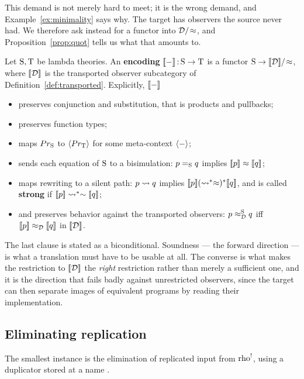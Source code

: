 \documentclass{article}
\begin{document}
This demand is not merely hard to meet; it is the wrong demand, and Example~\ref{ex:minimality} says why. The target has observers the source never had. We therefore ask instead for a functor into $\mathcal{D}/\!\approx$, and Proposition~\ref{prop:quot} tells us what that amounts to.

\begin{definition}
\label{def:encoding}
    Let $\mathrm{S},\mathrm{T}$ be lambda theories. An \textbf{encoding} $[\![-]\!]\,{:}\, \mathrm{S}\to \mathrm{T}$ is a functor $\mathrm{S}\to [\![\mathcal{D}]\!]/\!\approx$, where $[\![\mathcal{D}]\!]$ is the transported observer subcategory of Definition~\ref{def:transported}. Explicitly, $[\![-]\!]$
    \begin{itemize}
        \item preserves conjunction and substitution, that is products and pullbacks;
        \item preserves function types;
        \item maps $Pr_{\mathrm{S}}$ to $\langle Pr_{\mathrm{T}}\rangle$ for some meta-context $\langle -\rangle$;
        \item sends each equation of $\mathrm{S}$ to a bisimulation: $p=_{\mathrm{S}}q$ implies $[\![p]\!]\approx[\![q]\!]$;
        \item maps rewriting to a silent path: $p\rightsquigarrow q$ implies $[\![p]\!](\rightsquigarrow^\ast\approx)^\ast[\![q]\!]$, and is called \textbf{strong} if $[\![p]\!]\rightsquigarrow^\ast\sim[\![q]\!]$;
        \item and preserves behavior against the transported observers: $p\approx_{\mathcal{D}}^{\mathrm{S}} q$ iff $[\![p]\!]\approx_{\mathcal{D}}[\![q]\!]$ in $[\![\mathcal{D}]\!]$.
    \end{itemize}
\end{definition}

The last clause is stated as a biconditional. Soundness --- the forward direction --- is what a translation must have to be usable at all. The converse is what makes the restriction to $[\![\mathcal{D}]\!]$ the \emph{right} restriction rather than merely a sufficient one, and it is the direction that fails badly against unrestricted observers, since the target can then separate images of equivalent programs by reading their implementation.

\subsection{Eliminating replication}

The smallest instance is the elimination of replicated input from $\mathrm{rho}^{!}$, using a duplicator stored at a name \citep{lybech}.
\end{document}
